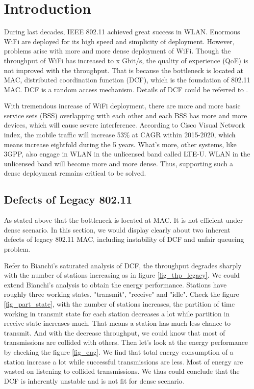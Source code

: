 \chapter{Introduction}  \label{chp_intro}
During last decades, IEEE 802.11 achieved great success in WLAN. Enormous WiFi are deployed for its high speed and simplicity of deployment. 
However, problems arise with more and more dense deployment of WiFi.
Though the throughput of WiFi has increased to x Gbit/s, the quality of experience (QoE) is not improved with the throughput.
That is because the bottleneck is located at MAC, distributed coordination function (DCF), which is the foundation of 802.11 MAC.
DCF is a random access mechanism. Details of DCF could be referred to \cite{bianchi2000performance}.

With tremendous increase of WiFi deployment, there are more and more basic service sets (BSS) overlapping with each other and each BSS has more and more devices, which will cause severe interference. 
According to Cisco Visual Network index\cite{cisco2016}, the mobile traffic will increase 53\% at CAGR within 2015-2020, which means increase eightfold during the 5 years.
What's more, other systems, like 3GPP, also engage in WLAN in the unlicensed band called LTE-U. WLAN in the unlicensed band will become more and more dense. 
Thus, supporting such a dense deployment remains critical to be solved. 

\section{Defects of Legacy 802.11}
As stated above that the bottleneck is located at MAC. It is not efficient under dense scenario.
In this section, we would display clearly about two inherent defects of legacy 802.11 MAC, including instability of DCF and unfair queueing problem.


\vspace*{0.5cm}

Refer to Bianchi's saturated analysis of DCF\cite{bianchi2000performance}, the throughput degrades sharply with the number of stations increasing as in figure \ref{fig_thp_legacy}.
We could extend Bianchi's analysis to obtain the energy performance.
Stations have roughly three working states, "transmit", "receive" and "idle".
Check the figure \ref{fig_part_state}, with the number of stations increases, the partition of time working in transmit state for each station decreases a lot while partition in receive state increases much. 
That means a station has much less chance to transmit. And with the decrease throughput, we could know that most of transmissions are collided with others. 
Then let's look at the energy performance by checking the figure \ref{fig_eng}. 
We find that total energy consumption of a station increase a lot while successful transmissions are less.
Most of energy are wasted on listening to collided transmissions.
We thus could conclude that the DCF is inherently unstable and is not fit for dense scenario.

